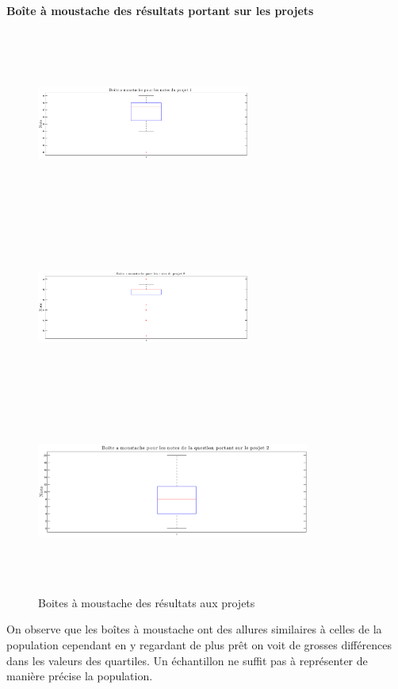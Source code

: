 \documentclass[a4paper, 11pt]{article}
\begin{document}
	\paragraph{Boîte à moustache des résultats portant sur les projets}
	   \begin{figure} [H]
	\begin{center}
		\includegraphics[height=6cm, width = 7cm]{Fig/Q2A21.eps}
		\includegraphics[height=6cm, width = 7cm]{Fig/Q2A22.eps}
		\includegraphics[height=6cm, width = 9cm]{Fig/Q2A23.eps}
		\caption{Boites à moustache des résultats aux projets}
		\label{QA2}
	\end{center}	
	\end{figure}
	On observe que les boîtes à moustache ont des allures similaires à celles de la population cependant en y regardant de plus prêt on voit de grosses différences dans les valeurs des quartiles. Un échantillon ne suffit pas à représenter de manière précise la population.
\end{document}
